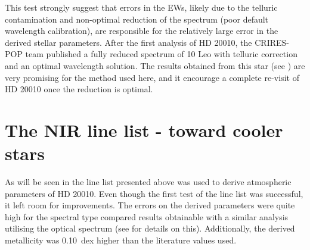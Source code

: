 This test strongly suggest that errors in the EWs, likely due to the telluric contamination and
non-optimal reduction of the spectrum (poor default wavelength calibration), are responsible for the
relatively large error in the derived stellar parameters. After the first analysis of HD 20010, the
CRIRES-POP team published a fully reduced spectrum of 10 Leo \citep{Nicholls2017} with telluric
correction and an optimal wavelength solution. The results obtained from this star (see
) are very promising for the method used here, and it encourage a complete re-visit
of HD 20010 once the reduction is optimal.


\section{The NIR line list - toward cooler stars}
\label{sec:linelist_second}

As will be seen in  the line list presented above was used to derive
atmospheric parameters of HD 20010. Even though the first test of the line list was successful, it
left room for improvements. The errors on the derived parameters were quite high for the spectral
type compared results obtainable with a similar analysis utilising the optical spectrum (see
 for details on this). Additionally, the derived metallicity was
\SI{0.10}{dex} higher than the literature values used.

